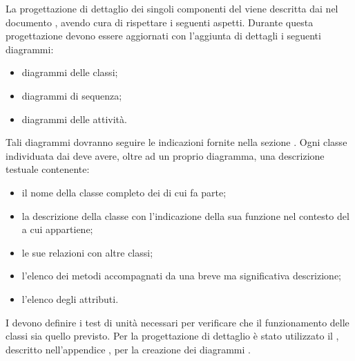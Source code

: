 La progettazione di dettaglio dei singoli componenti del  \projectname{} viene descritta dai  nel documento , avendo cura di rispettare i seguenti aspetti.
Durante questa progettazione devono essere aggiornati con l'aggiunta di dettagli i seguenti diagrammi:
\begin{itemize}
\item diagrammi delle classi;
\item diagrammi di sequenza;
\item diagrammi delle attività.
\end{itemize}
Tali diagrammi dovranno seguire le indicazioni fornite nella sezione .
Ogni classe individuata dai  deve avere, oltre ad un proprio diagramma, una descrizione testuale contenente:
\begin{itemize}
\item il nome della classe completo dei  di cui fa parte;
\item la descrizione della classe con l'indicazione della sua funzione nel contesto del  a cui appartiene;
\item le sue relazioni con altre classi;
\item l'elenco dei metodi accompagnati da una breve ma significativa descrizione;
\item l'elenco degli attributi.
\end{itemize}
I  devono definire i test di unità necessari per verificare che il funzionamento delle classi sia quello previsto.
Per la progettazione di dettaglio è stato utilizzato il  , descritto nell'appendice , per la creazione dei diagrammi .

